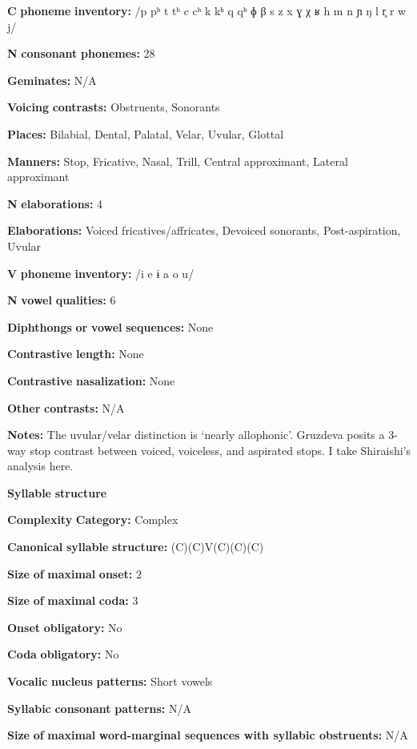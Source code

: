 \textbf{C} \textbf{phoneme} \textbf{inventory:} /p pʰ t tʰ c cʰ k kʰ q qʰ ɸ β s z x ɣ χ ʁ h m n ɲ ŋ l r̥ r w j/

\textbf{N} \textbf{consonant} \textbf{phonemes:} 28

\textbf{Geminates:} N/A

\textbf{Voicing} \textbf{contrasts:} Obstruents, Sonorants

\textbf{Places:} Bilabial, Dental, Palatal, Velar, Uvular, Glottal

\textbf{Manners:} Stop, Fricative, Nasal, Trill, Central approximant, Lateral approximant

\textbf{N} \textbf{elaborations:} 4

\textbf{Elaborations:} Voiced fricatives/affricates, Devoiced sonorants, Post-aspiration, Uvular

\textbf{V} \textbf{phoneme} \textbf{inventory:} /i e ɨ a o u/

\textbf{N} \textbf{vowel} \textbf{qualities:} 6

\textbf{Diphthongs} \textbf{or} \textbf{vowel} \textbf{sequences:} None

\textbf{Contrastive} \textbf{length:} None

\textbf{Contrastive} \textbf{nasalization:} None

\textbf{Other} \textbf{contrasts:} N/A

\textbf{Notes:} The uvular/velar distinction is ‘nearly allophonic’. Gruzdeva posits a 3-way stop contrast between voiced, voiceless, and aspirated stops. I take Shiraishi’s analysis here.

\textbf{Syllable} \textbf{structure}

\textbf{Complexity} \textbf{Category:} Complex

\textbf{Canonical} \textbf{syllable} \textbf{structure:} (C)(C)V(C)(C)(C) \citep[29-30]{Shiraishi2006}

\textbf{Size} \textbf{of} \textbf{maximal} \textbf{onset:} 2

\textbf{Size} \textbf{of} \textbf{maximal} \textbf{coda:} 3

\textbf{Onset} \textbf{obligatory:} No

\textbf{Coda} \textbf{obligatory:} No

\textbf{Vocalic} \textbf{nucleus} \textbf{patterns:} Short vowels

\textbf{Syllabic} \textbf{consonant} \textbf{patterns:} N/A

\textbf{Size} \textbf{of} \textbf{maximal} \textbf{word{}-marginal sequences with syllabic obstruents:} N/A

